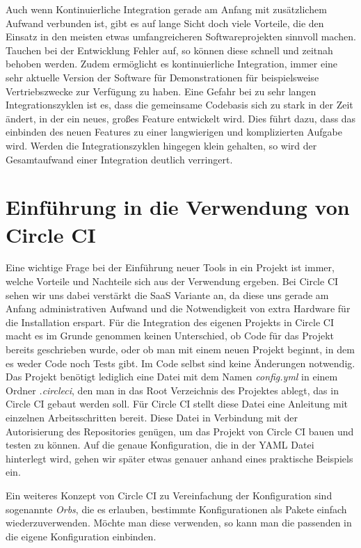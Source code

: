 \documentclass[11pt]{article}
\begin{document}
Auch wenn Kontinuierliche Integration gerade am Anfang mit zusätzlichem Aufwand verbunden ist, gibt es
auf lange Sicht doch viele Vorteile, die den Einsatz in den meisten etwas umfangreicheren
Softwareprojekten sinnvoll machen.
Tauchen bei der Entwicklung Fehler auf, so können diese schnell und zeitnah behoben werden.
Zudem ermöglicht es kontinuierliche Integration, immer eine sehr aktuelle Version der Software für
Demonstrationen für beispielsweise Vertriebszwecke zur Verfügung zu haben.
Eine Gefahr bei zu sehr langen Integrationszyklen ist es, dass die gemeinsame Codebasis sich zu
stark in der Zeit ändert, in der ein neues, großes Feature entwickelt wird. Dies führt dazu, dass
das einbinden des neuen Features zu einer langwierigen und komplizierten Aufgabe wird. Werden die
Integrationszyklen hingegen klein gehalten, so wird der Gesamtaufwand einer Integration deutlich
verringert.

\section{Einführung in die Verwendung von Circle CI}
Eine wichtige Frage bei der Einführung neuer Tools in ein Projekt ist immer, welche Vorteile und
Nachteile sich aus der Verwendung ergeben. Bei Circle CI sehen wir uns dabei verstärkt die SaaS
Variante an, da diese uns gerade am Anfang administrativen Aufwand und die Notwendigkeit von
extra Hardware für die Installation erspart. Für die Integration des eigenen Projekts in Circle CI
macht es im Grunde genommen keinen Unterschied, ob Code für das Projekt bereits geschrieben wurde,
oder ob man mit einem neuen Projekt beginnt, in dem es weder Code noch Tests gibt. Im Code selbst
sind keine Änderungen notwendig. Das Projekt benötigt lediglich eine Datei mit dem Namen
\textit{config.yml} in einem Ordner \textit{.circleci}, den man in das Root Verzeichnis des Projektes
ablegt, das in Circle CI gebaut werden soll. Für Circle CI stellt diese Datei eine Anleitung mit
einzelnen Arbeitsschritten bereit. Diese Datei in Verbindung mit der Autorisierung des Repositories
genügen, um das Projekt von Circle CI bauen und testen zu können. Auf die genaue Konfiguration, die
in der YAML Datei hinterlegt wird, gehen wir später etwas genauer anhand eines praktische Beispiels
ein.

Ein weiteres Konzept von Circle CI zu Vereinfachung der Konfiguration sind sogenannte \textit{Orbs}, die es erlauben, bestimmte Konfigurationen als Pakete einfach wiederzuverwenden. Möchte man diese verwenden, so kann man die passenden in die eigene Konfiguration einbinden.
\end{document}
